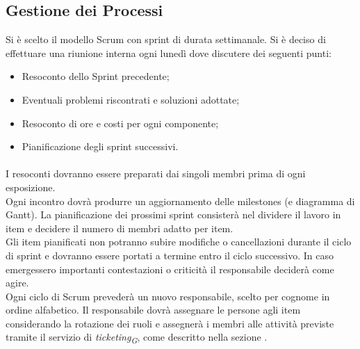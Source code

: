 \documentclass[a4paper, 12pt]{article}
\begin{document}
\subsection{Gestione dei Processi}
Si è scelto il modello Scrum con sprint di durata settimanale. Si è deciso di effettuare una riunione interna ogni lunedì dove discutere dei seguenti punti:
\begin{itemize}
    \item Resoconto dello Sprint precedente;
    \item Eventuali problemi riscontrati e soluzioni adottate;
    \item Resoconto di ore e costi per ogni componente;
    \item Pianificazione degli sprint successivi.
\end{itemize}
\paragraph{} I resoconti dovranno essere preparati dai singoli membri prima di ogni esposizione.\\ Ogni incontro dovrà produrre un aggiornamento delle milestones (e diagramma di Gantt). La pianificazione dei prossimi sprint consisterà nel dividere il lavoro in item e decidere il
numero di membri adatto per item. \\
\indent Gli item pianificati non potranno subire modifiche o cancellazioni durante il ciclo di sprint e dovranno essere portati a termine entro il ciclo successivo.
In caso emergessero importanti contestazioni o criticità il responsabile deciderà
come agire.\\
\indent Ogni ciclo di Scrum prevederà un nuovo responsabile, scelto per cognome in ordine alfabetico. Il responsabile dovrà assegnare le persone agli item considerando la
rotazione dei ruoli e assegnerà i membri alle attività previste tramite il
servizio di \textit{ticketing\textsubscript{G}}, come descritto nella sezione . \\
\end{document}
